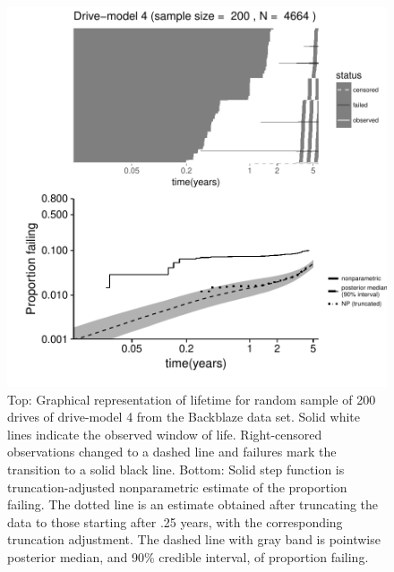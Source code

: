 \documentclass[12pt]{article}
\begin{document}
\begin{figure}
\centering
\includegraphics{dm4-exception}
\caption{Top: Graphical representation of lifetime for random sample of 200 drives of drive-model 4 from the Backblaze data set. Solid white lines indicate the observed window of life. Right-censored observations changed to a dashed line and failures mark the transition to a solid black line. Bottom: Solid step function is truncation-adjusted nonparametric estimate of the proportion failing. The dotted line is an estimate obtained after truncating the data to those starting after .25 years, with the corresponding truncation adjustment. The dashed line with gray band is pointwise posterior median, and 90\% credible interval, of proportion failing.}

\label{fig:ex-mod-4}
\end{figure}
\end{document}

